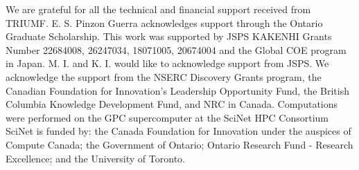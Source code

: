 \documentclass[%
 reprint,
showpacs,
 amsmath,amssymb,
 aps,
 prc,
]{revtex4-1}
\begin{document}
\maketitle








\begin{acknowledgments}
We are grateful for all the technical and financial support received from TRIUMF.
E. S. Pinzon Guerra acknowledges support through the Ontario Graduate Scholarship.
This work was supported by JSPS KAKENHI Grants Number 22684008, 26247034, 18071005, 20674004
and the Global COE program in Japan. M. I. and K. I. would like to acknowledge support from JSPS.
We acknowledge the support from the NSERC Discovery Grants program, the Canadian Foundation for Innovation’s
Leadership Opportunity Fund, the British Columbia Knowledge Development Fund, and NRC in Canada.
Computations were performed on the GPC supercomputer at the SciNet HPC Consortium \cite{scinet}
SciNet is funded by: the Canada Foundation for Innovation under the auspices of Compute Canada; 
the Government of Ontario; Ontario Research Fund - Research Excellence; and the University of Toronto.
\end{acknowledgments}


\end{document}
